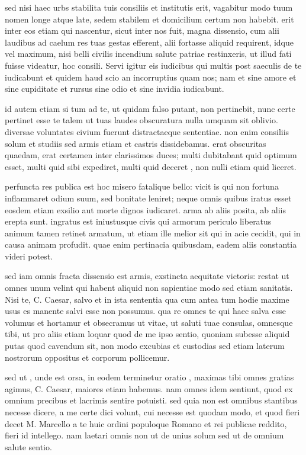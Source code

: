 sed nisi haec urbs stabilita tuis consiliis et institutis erit, vagabitur modo tuum nomen longe atque late, sedem stabilem et domicilium certum non habebit. erit inter eos etiam qui nascentur, sicut inter nos fuit, magna dissensio, cum alii laudibus ad caelum res tuas gestas efferent, alii fortasse aliquid requirent, idque vel maximum, nisi belli civilis incendium salute patriae restinxeris, ut illud fati fuisse videatur, hoc consili. Servi igitur eis iudicibus qui multis post saeculis de te iudicabunt et quidem haud scio an incorruptius quam nos; nam et sine amore et sine cupiditate et rursus sine odio et sine invidia iudicabunt.

 id autem etiam si tum ad te, ut quidam falso putant, non pertinebit, nunc certe pertinet esse te talem ut tuas laudes obscuratura nulla umquam sit oblivio. diversae voluntates civium fuerunt distractaeque sententiae. non enim consiliis solum et studiis sed armis etiam et castris dissidebamus. erat obscuritas quaedam, erat certamen inter clarissimos duces; multi dubitabant quid optimum esset, multi quid sibi expediret, multi quid deceret , non nulli etiam quid liceret.

 perfuncta res publica est hoc misero fatalique bello: vicit is qui non fortuna inflammaret odium suum, sed bonitate leniret; neque omnis quibus iratus esset eosdem etiam exsilio aut morte dignos iudicaret. arma ab aliis posita, ab aliis erepta sunt. ingratus est iniustusque civis qui armorum periculo liberatus animum tamen retinet armatum, ut etiam ille melior sit qui in acie cecidit, qui in causa animam profudit. quae enim pertinacia quibusdam, eadem aliis constantia videri potest.

 sed iam omnis fracta dissensio est armis, exstincta aequitate victoris: restat ut omnes unum velint qui habent aliquid non sapientiae modo sed etiam sanitatis. Nisi te, C. Caesar, salvo et in ista sententia qua cum antea tum hodie maxime usus es manente salvi esse non possumus. qua re omnes te qui haec salva esse volumus et hortamur et obsecramus ut vitae, ut saluti tuae consulas, omnesque tibi, ut pro aliis etiam loquar quod de me ipso sentio, quoniam subesse aliquid putas quod cavendum sit, non modo excubias et custodias sed etiam laterum nostrorum oppositus et corporum pollicemur.

 sed ut , unde est orsa, in eodem terminetur oratio , maximas tibi omnes gratias agimus, C. Caesar, maiores etiam habemus. nam omnes idem sentiunt, quod ex omnium precibus et lacrimis sentire potuisti. sed quia non est omnibus stantibus necesse dicere, a me certe dici volunt, cui necesse est quodam modo, et quod fieri decet M. Marcello a te huic ordini populoque Romano et rei publicae reddito, fieri id intellego. nam laetari omnis non ut de unius solum sed ut de omnium salute sentio.

